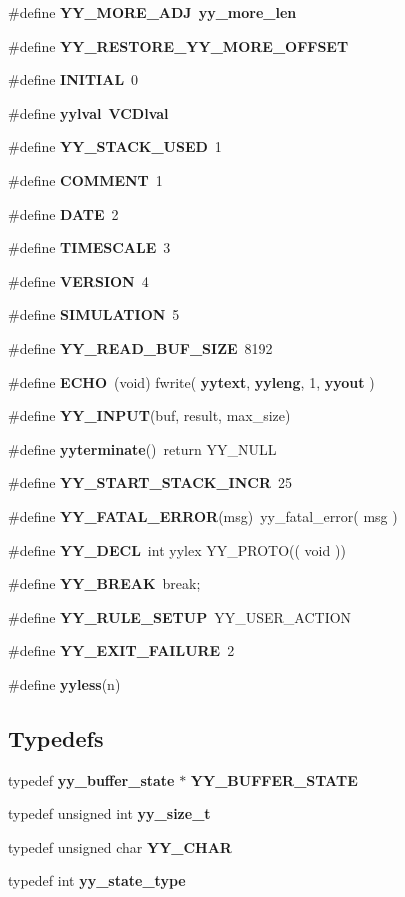 \begin{CompactItemize}
\item 
\#define {\bf YY\_\-MORE\_\-ADJ}\ {\bf yy\_\-more\_\-len}
\item 
\#define {\bf YY\_\-RESTORE\_\-YY\_\-MORE\_\-OFFSET}
\item 
\#define {\bf INITIAL}\ 0
\item 
\#define {\bf yylval}\ {\bf VCDlval}
\item 
\#define {\bf YY\_\-STACK\_\-USED}\ 1
\item 
\#define {\bf COMMENT}\ 1
\item 
\#define {\bf DATE}\ 2
\item 
\#define {\bf TIMESCALE}\ 3
\item 
\#define {\bf VERSION}\ 4
\item 
\#define {\bf SIMULATION}\ 5
\item 
\#define {\bf YY\_\-READ\_\-BUF\_\-SIZE}\ 8192
\item 
\#define {\bf ECHO}\ (void) fwrite( {\bf yytext}, {\bf yyleng}, 1, {\bf yyout} )
\item 
\#define {\bf YY\_\-INPUT}(buf, result, max\_\-size)
\item 
\#define {\bf yyterminate}()\ return YY\_\-NULL
\item 
\#define {\bf YY\_\-START\_\-STACK\_\-INCR}\ 25
\item 
\#define {\bf YY\_\-FATAL\_\-ERROR}(msg)\ yy\_\-fatal\_\-error( msg )
\item 
\#define {\bf YY\_\-DECL}\ int yylex YY\_\-PROTO(( void ))
\item 
\#define {\bf YY\_\-BREAK}\ break;
\item 
\#define {\bf YY\_\-RULE\_\-SETUP}\ YY\_\-USER\_\-ACTION
\item 
\#define {\bf YY\_\-EXIT\_\-FAILURE}\ 2
\item 
\#define {\bf yyless}(n)
\end{CompactItemize}
\subsection*{Typedefs}
\begin{CompactItemize}
\item 
typedef {\bf yy\_\-buffer\_\-state} $\ast$ {\bf YY\_\-BUFFER\_\-STATE}
\item 
typedef unsigned int {\bf yy\_\-size\_\-t}
\item 
typedef unsigned char {\bf YY\_\-CHAR}
\item 
typedef int {\bf yy\_\-state\_\-type}
\end{CompactItemize}
